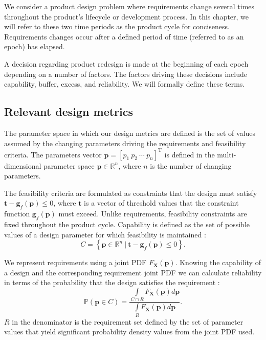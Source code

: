We consider a product design problem where requirements change several times throughout the product's lifecycle or development process. In this chapter, we will refer to these two time periods as the product cycle for conciseness. Requirements changes occur after a defined period of time (referred to as an epoch) has elapsed.

A decision regarding product redesign is made at the beginning of each epoch depending on a number of factors. The factors driving these decisions include capability, buffer, excess, and reliability. We will formally define these terms.

\subsection{Relevant design metrics} \label{subsec:designmetrics}

The parameter space in which our design metrics are defined is the set of values assumed by the changing parameters driving the requirements and feasibility criteria. The parameters vector $\mathbf{p} = \left[p_1 ~ p_2 ~ \cdots ~ p_n\right]^{\mathrm{T}}$ is defined in the multi-dimensional parameter space $\mathbf{p}\in\mathbb{R}^n$, where $n$ is the number of changing parameters.

The feasibility criteria are formulated as constraints that the design must satisfy $\mathbf{t} - \mathbf{g}_{f}(\mathbf{p}) \le 0$, where $\mathbf{t}$ is a vector of threshold values that the constraint function $\mathbf{g}_{f}(\mathbf{p})$ must exceed. Unlike requirements, feasibility constraints are fixed throughout the product cycle. Capability is defined as the set of possible values of a design parameter for which feasibility is maintained \cite{Eckert2019}:
%
\begin{equation} \label{eq:capability}
	\textit{C} = \left\{\mathbf{p} \in \mathbb{R}^n~|~ \mathbf{t} - \mathbf{g}_{f}(\mathbf{p}) \le 0\right\}.
\end{equation}

We represent requirements using a joint \acf{PDF} $F_{\mathbf{X}}\left(\mathbf{p}\right)$\cite{Villanueva2014,Pradlwarter2005,Frangopol2003a,Zhu2013a}. Knowing the capability of a design and the corresponding requirement joint \ac{PDF} we can calculate reliability in terms of the probability that the design satisfies the requirement \cite{ForouzandehShahraki2014,Bucher2009}:
%
\begin{equation} \label{eq:reliability}
	\mathbb{P}(\mathbf{p} \in C) = \dfrac{\int\limits_{C\cap R} F_{\mathbf{X}}(\mathbf{p}) d\mathbf{p}}{\int\limits_{R} F_{\mathbf{X}}(\mathbf{p}) d\mathbf{p}}.
\end{equation}
%
$R$ in the denominator is the requirement set defined by the set of parameter values that yield significant probability density values from the joint \ac{PDF} used.

